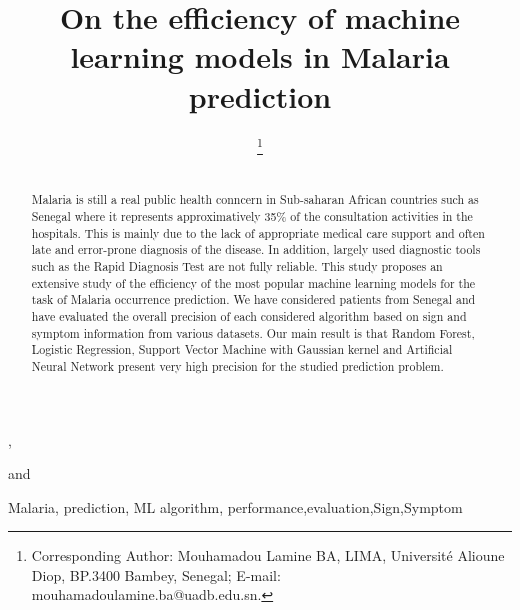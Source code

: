 \documentclass{IOS-Book-Article}
\def\hb{\hbox to 10.7 cm{}}
\def\hb{\hbox to 10.7 cm{}}
\begin{document}
\pagestyle{headings}
\def\thepage{}

\begin{frontmatter}              %

\title{On the efficiency of machine learning models in Malaria prediction}

\markboth{}{January 2020\hb}

\author{ },
\author{ 
\thanks{Corresponding Author: Mouhamadou Lamine BA, LIMA, Universit\'e Alioune Diop,
BP.3400 Bambey, Senegal; E-mail: mouhamadoulamine.ba@uadb.edu.sn.}}
and
\author{ }

\address{LIMA, Universit\'e Alioune Diop, Bambey, Senegal}

\begin{abstract}\\
Malaria is still a real public health conncern in Sub-saharan African countries such as Senegal where it represents approximatively 35\% of the consultation activities in the hospitals. This is mainly due to the lack of appropriate medical care support and often late and error-prone diagnosis of the disease. In addition, largely used diagnostic tools such as the Rapid Diagnosis Test are not fully reliable. This study proposes an extensive study of the efficiency of the most popular  machine learning models for the task of Malaria occurrence prediction. We have considered patients from Senegal and have evaluated the overall precision of each considered algorithm based on sign and symptom information from various datasets. Our main result is that Random Forest, Logistic Regression, Support Vector Machine with Gaussian kernel and Artificial Neural Network present very high precision for the studied prediction problem.
\end{abstract}

\begin{keyword}
Malaria, prediction, ML algorithm, 
performance\sep evaluation\sep Sign\sep Symptom
\end{keyword}
\end{frontmatter}
\markboth{January 2021\hb}



%







\end{document}
